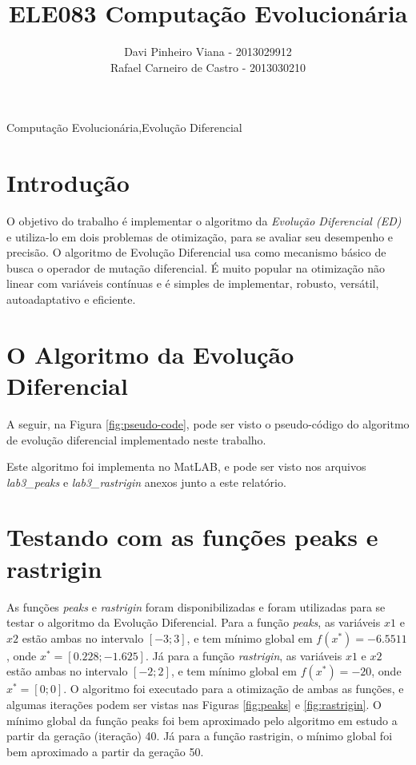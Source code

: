 \documentclass[12pt]{elsarticle}
\begin{document}
	\begin{frontmatter}

		\title{ELE083 Computação Evolucionária\\ }
		\author{Davi Pinheiro Viana - 2013029912\\Rafael Carneiro de Castro - 2013030210}
		\address{Minas Gerais, Brasil}
		
		\begin{keyword}
			Computação Evolucionária\sep Evolução Diferencial
		\end{keyword}
	\end{frontmatter}
	
	\section{Introdução}
	O objetivo do trabalho é implementar o algoritmo da \emph{Evolução Diferencial (ED)} e utiliza-lo em dois problemas de otimização, para se avaliar seu desempenho e precisão. O algoritmo de Evolução Diferencial usa como mecanismo básico de busca o operador de mutação diferencial. É muito popular na otimização não linear com variáveis contínuas e é simples de implementar, robusto, versátil, autoadaptativo e eficiente.

	\section{O Algoritmo da Evolução Diferencial}
	A seguir, na Figura \ref{fig:pseudo-code}, pode ser visto o pseudo-código do algoritmo de evolução diferencial implementado neste trabalho.
	
	Este algoritmo foi implementa no MatLAB, e pode ser visto nos arquivos \textit{lab3\_peaks} e \textit{lab3\_rastrigin} anexos junto a este relatório.
	
	\section{Testando com as funções peaks e rastrigin}
	As funções \textit{peaks} e \textit{rastrigin} foram disponibilizadas e foram utilizadas para se testar o algoritmo da Evolução Diferencial. Para a função \textit{peaks}, as variáveis $x1$ e $x2$ estão ambas no intervalo $[-3; 3]$, e tem mínimo global em $f(x^*) = -6.5511$, onde $x^* = [0.228; -1.625]$. Já para a função \textit{rastrigin}, as variáveis $x1$ e $x2$ estão ambas no intervalo $[-2; 2]$, e tem mínimo global em $f(x^*) = -20$, onde $x^* = [0; 0]$. O algoritmo foi executado para a otimização de ambas as funções, e algumas iterações podem ser vistas nas Figuras \ref{fig:peaks} e \ref{fig:rastrigin}. O mínimo global da função peaks foi bem aproximado pelo algoritmo em estudo a partir da geração (iteração) 40. Já para a função rastrigin, o mínimo global foi bem aproximado a partir da geração 50.
	
\end{document}
